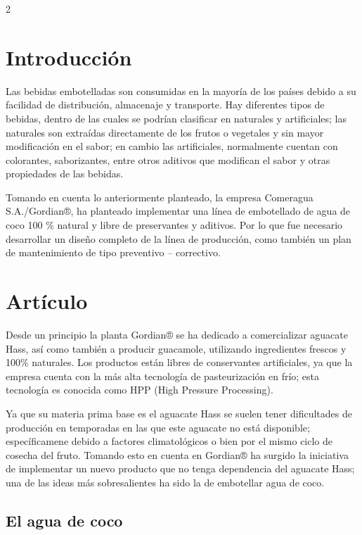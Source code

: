 \documentclass[11pt,spanish,Letterpaper,openany]{book}
\begin{document}
\begin {multicols}{2}

\hypertarget{introduccion-3}{%
\section{Introducción}\label{introduccion-3}}

Las bebidas embotelladas son consumidas en la mayoría de los países debido a su facilidad de distribución, almacenaje y transporte. Hay diferentes tipos de bebidas, dentro de las cuales se podrían clasificar en naturales y artificiales; las naturales son extraídas directamente de los frutos o vegetales y sin mayor modificación en el sabor; en cambio las artificiales, normalmente cuentan con colorantes, saborizantes, entre otros aditivos que modifican el sabor y otras propiedades de las bebidas.

Tomando en cuenta lo anteriormente planteado, la empresa Comeragua S.A./Gordian®, ha planteado implementar una línea de embotellado de agua de coco 100 \% natural y libre de preservantes y aditivos. Por lo que fue necesario desarrollar un diseño completo de la línea de producción, como también un plan de mantenimiento de tipo preventivo -- correctivo.

\hypertarget{articulo-2}{%
\section{Artículo}\label{articulo-2}}

Desde un principio la planta Gordian® se ha dedicado a comercializar aguacate Hass, así como también a producir guacamole, utilizando ingredientes frescos y 100\% naturales. Los productos están libres de conservantes artificiales, ya que la empresa cuenta con la más alta tecnología de pasteurización en frío; esta tecnología es conocida como HPP (High Pressure Processing).

\medskip

Ya que su materia prima base es el aguacate Hass se suelen tener dificultades de producción en temporadas en las que este aguacate no está disponible; específicamene debido a factores climatológicos o bien por el mismo ciclo de cosecha del fruto. Tomando esto en cuenta en Gordian® ha surgido la iniciativa de implementar un nuevo producto que no tenga dependencia del aguacate Hass; una de las ideas más sobresalientes ha sido la de embotellar agua de coco.

\hypertarget{el-agua-de-coco}{%
\subsection{El agua de coco}\label{el-agua-de-coco}}


\end{multicols}
\end{document}
